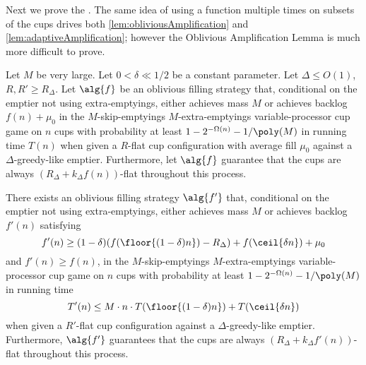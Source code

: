 Next we prove the . The same
idea of using a function multiple times on subsets of the cups
drives both \cref{lem:obliviousAmplification} and
\cref{lem:adaptiveAmplification};
however the Oblivious Amplification Lemma is much more difficult to prove.
\begin{lemma}
  \label{lem:obliviousAmplification} 
  Let $M$ be very large.
  Let $0 < \delta \ll 1/2$ be a constant
  parameter. Let $\Delta \le O(1)$, $R, R' \ge R_\Delta$. Let
  $\alg{f}$ be an oblivious filling strategy that, conditional on
  the emptier not using extra-emptyings, either achieves mass $M$
  or achieves backlog $f(n)+\mu_0$ in the $M$-skip-emptyings
  $M$-extra-emptyings variable-processor cup game
  on $n$ cups with probability at least
  $1-2^{-\Omega(n)}-1/\poly(M)$ in
  running time $T(n)$ when given a $R$-flat cup
  configuration with average fill $\mu_0$ against a $\Delta$-greedy-like emptier.
  Furthermore, let $\alg{f}$ guarantee that the cups are always
  $(R_\Delta + k_\Delta f(n))$-flat throughout this process.

  There exists an oblivious filling strategy $\alg{f'}$ that,
  conditional on the emptier not using extra-emptyings,
  either achieves mass $M$ or achieves backlog $f'(n)$
  satisfying
  $$f'(n) \ge (1-\delta) (f(\floor{(1-\delta)n})-R_\Delta) + f(\ceil{\delta n}) + \mu_0$$
   and $f'(n) \ge f(n)$, in the $M$-skip-emptyings
  $M$-extra-emptyings variable-processor cup
  game on $n$ cups with probability at least
  $1-2^{-\Omega(n)}-1/\poly(M)$
  in running time $$T'(n) \le M\cdot n\cdot
  T(\floor{(1-\delta)n}) + T(\ceil{\delta n})$$ when given a
  $R'$-flat cup configuration against a $\Delta$-greedy-like
  emptier.
  Furthermore, $\alg{f'}$ guarantees that the cups are always
  $(R_\Delta + k_\Delta f'(n))$-flat throughout this process.
\end{lemma}
